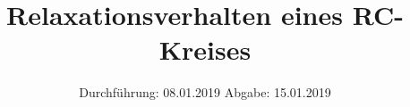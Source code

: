 

\subject{V353}
\title{Relaxationsverhalten eines RC-Kreises}
\date{%
  Durchführung: 08.01.2019
  \hspace{3em}
  Abgabe: 15.01.2019
}



\maketitle
\thispagestyle{empty}
\tableofcontents
\newpage






\printbibliography{}


